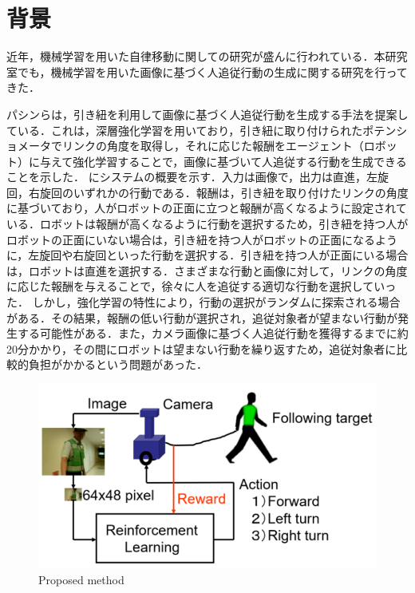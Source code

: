 
\section{背景}
近年，機械学習を用いた自律移動に関しての研究が盛んに行われている．本研究室でも，機械学習を用いた画像に基づく人追従行動の生成に関する研究を行ってきた．

パシンら\cite{pasin1}\cite{pasin2}\cite{pasin3}は，引き紐を利用して画像に基づく人追従行動を生成する手法を提案している．これは，深層強化学習\cite{hado}を用いており，引き紐に取り付けられたポテンショメータでリンクの角度を取得し，それに応じた報酬をエージェント（ロボット）に与えて強化学習\cite{leslie}することで，画像に基づいて人追従する行動を生成できることを示した．
にシステムの概要を示す．入力は画像で，出力は直進，左旋回，右旋回のいずれかの行動である．報酬は，引き紐を取り付けたリンクの角度に基づいており，人がロボットの正面に立つと報酬が高くなるように設定されている．ロボットは報酬が高くなるように行動を選択するため，引き紐を持つ人がロボットの正面にいない場合は，引き紐を持つ人がロボットの正面になるように，左旋回や右旋回といった行動を選択する．引き紐を持つ人が正面にいる場合は，ロボットは直進を選択する．さまざまな行動と画像に対して，リンクの角度に応じた報酬を与えることで，徐々に人を追従する適切な行動を選択していった．
しかし，強化学習の特性により，行動の選択がランダムに探索される場合がある．その結果，報酬の低い行動が選択され，追従対象者が望まない行動が発生する可能性がある．また，カメラ画像に基づく人追従行動を獲得するまでに約20分かかり，その間にロボットは望まない行動を繰り返すため，追従対象者に比較的負担がかかるという問題があった．

  \begin{figure}[h]
    \centering
    \includegraphics[keepaspectratio, scale=0.45] {images/pasin_system.png}
    \caption{Proposed method \cite{pasin1}}
    \label{Fig:pasin_system}
  \end{figure}

